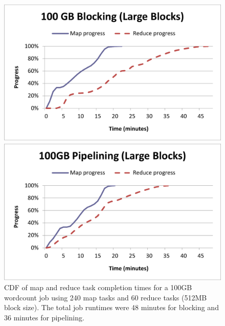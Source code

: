 \begin{figure}[t]
\ssp
\begin{minipage}{0.5\linewidth}
  \centering
        \includegraphics[width=0.95\linewidth]{figures/wc_100gb_240m60r_blocking}
\end{minipage}
\begin{minipage}{0.5\linewidth}
  \centering
        \includegraphics[width=0.95\linewidth]{figures/wc_100gb_240m60r_pipeline}
\end{minipage}
\caption{CDF of map and reduce task completion times for a 100GB wordcount job
  using 240 map tasks and 60 reduce tasks (512MB block size). The total job
  runtimes were 48 minutes for blocking and 36 minutes for pipelining.}
\label{ch:hop:fig:wc4}
\end{figure}

